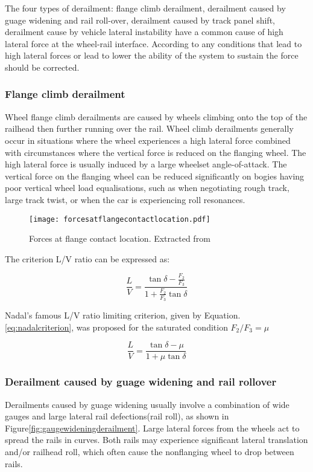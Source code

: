 The four types of derailment: flange climb derailment, derailment caused by guage widening and rail roll-over, derailment caused by track panel shift, derailment cause by vehicle lateral instability have a common cause of high lateral force at the wheel-rail interface. According to \cite[Chapter 8, IV]{iwnicki2006handbook} any conditions that lead to high lateral forces or lead to lower the ability of the system to sustain the force should be corrected. 

\subsubsection{Flange climb derailment}
Wheel flange climb derailments are caused by wheels climbing onto the top of the railhead then further running over the rail. Wheel climb derailments generally occur in situations where the wheel experiences a high lateral force combined with circumstances where the vertical force is reduced on the flanging wheel. The high lateral force is usually induced by a large wheelset angle-of-attack. The vertical force on the flanging wheel can be reduced significantly on bogies having poor vertical wheel load equalisations, such as when negotiating rough track, large track twist, or when the car is experiencing roll resonances. 

\begin{figure}[h]
	\centering
	\texttt{[image: forcesatflangecontactlocation.pdf]}
	\caption{Forces at flange contact location. Extracted from \cite[Figure8.4]{iwnicki2006handbook}}
	\label{fig:forcesatflangecontactlocation}
\end{figure}

The criterion L/V ratio can be expressed as:

\begin{equation}
	\frac{L}{V}=\frac{\tan \delta -\frac{F_2}{F_3}}{1+\frac{F_2}{F_3}\tan \delta}
\end{equation}

Nadal's famous L/V ratio limiting criterion, given by Equation.\ref{eq:nadalcriterion}, was proposed for the saturated condition $F_2/F_3=\mu$

\begin{equation}\label{eq:nadalcriterion}
	\frac{L}{V}=\frac{\tan \delta - \mu}{1+ \mu \tan \delta}
\end{equation}

\subsubsection{Derailment caused by guage widening and rail rollover}
Derailments caused by guage widening usually involve a combination of wide gauges and large lateral rail defections(rail roll), as shown in Figure\ref{fig:gaugewideningderailment}. Large lateral forces from the wheels act to spread the rails in curves. Both rails may experience significant lateral translation and/or railhead roll, which often cause the nonflanging wheel to drop between rails.

